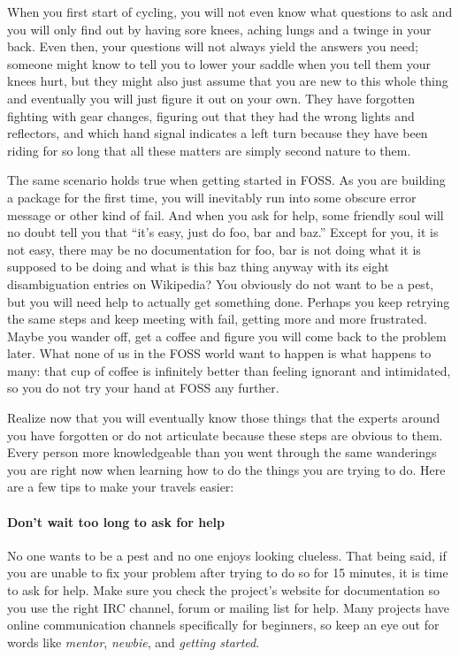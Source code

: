 When you first start of cycling, you will not even know what questions to ask
and you will only find out by having sore knees, aching lungs and a twinge in your back. Even then, your questions will not always yield the answers you need;
someone might know to tell you to lower your saddle when you tell them your
knees hurt, but they might also just assume that you are new to this whole thing
and eventually you will just figure it out on your own. They have forgotten
fighting with gear changes, figuring out that they had the wrong lights and
reflectors, and which hand signal indicates a left turn because they have been
riding for so long that all these matters are simply second nature to them.

The same scenario holds true when getting started in FOSS. As you are building a
package for the first time, you will inevitably run into some obscure error
message or other kind of fail. And when you ask for help, some friendly soul
will no doubt tell you that ``it’s easy, just do foo, bar and baz.'' Except for
you, it is not easy, there may be no documentation for foo, bar is not doing
what it is supposed to be doing and what is this baz thing anyway with its eight
disambiguation entries on Wikipedia? You obviously do not want to be a pest, but
you will need help to actually get something done. Perhaps you keep retrying the
same steps and keep meeting with fail, getting more and more frustrated. Maybe
you wander off, get a coffee and figure you will come back to the problem later.
What none of us in the FOSS world want to happen is what happens to many: that
cup of coffee is infinitely better than feeling ignorant and intimidated, so you
do not try your hand at FOSS any further.

Realize now that you will eventually know those things that the experts around
you have forgotten or do not articulate because these steps are obvious to them.
Every person more knowledgeable than you went through the same wanderings you
are right now when learning how to do the things you are trying to do. Here are
a few tips to make your travels easier:

\paragraph*{Don’t wait too long to ask for help} No one wants to be a pest and
no one enjoys looking clueless. That being said, if you are unable to fix your
problem after trying to do so for 15 minutes, it is time to ask for help. Make
sure you check the project’s website for documentation so you use the right IRC
channel, forum or mailing list for help. Many projects have online communication
channels specifically for beginners, so keep an eye out for words like
\textit{mentor}, \textit{newbie}, and \textit{getting started}.


